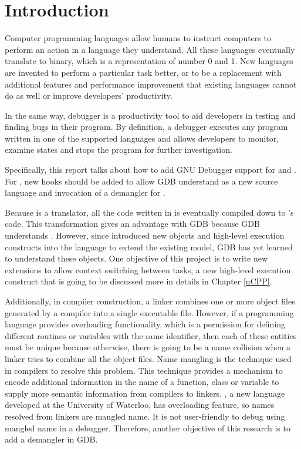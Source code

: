 \chapter{Introduction} \label{introduction}
Computer programming languages allow humans to instruct computers to perform an
action in a language they understand. All these languages eventually translate
to binary, which is a representation of number 0 and 1. New languages are
invented to perform a particular task better, or to be a replacement with
additional features and performance improvement that existing languages cannot do as well or
improve developers' productivity\cite{Reference1}.

In the same way, debugger is a productivity tool to aid developers in testing
and finding bugs in their program. By definition, a debugger executes
any program written in one of the supported languages and allows developers to
monitor, examine states and stops the program for further investigation.

Specifically, this report talks about how to add GNU Debugger support for \uCPPS
and \CFA.
For \CFA, new hooks should be added to allow GDB understand
\CFAS as a new source language and invocation of a demangler for \CFA.

Because \uCPPS is a translator, all the code written in \uCPPS is eventually
compiled down to \CC's code. This transformation gives \uCPPS an advantage with
GDB because GDB understands \CC. However, since \uCPPS introduced new objects
and high-level execution constructs into the language to extend the existing
model, GDB has yet learned to understand these objects. One objective of this
project is to write new extensions to allow context switching
between tasks, a new high-level execution construct that is going to be discussed more in
details in Chapter \ref{uCPP}.

Additionally, in compiler construction, a linker combines one or more object files generated
by a compiler into a single executable file. However, if a programming
language provides overloading functionality, which is a permission for defining different routines or variables with the
same identifier, then each of these entities must be unique because otherwise,
there is going to be a name collision when a linker tries to combine all the
object files. Name mangling is the technique used in compilers to resolve this
problem. This technique provides a mechanism to encode additional information in the
name of a function, class or variable to supply more semantic information from
compilers to linkers\cite{reference9}. \CFA, a new language developed at the University of
Waterloo, has overloading feature, so names resolved from
linkers are mangled name. It is not user-friendly to debug using mangled name in
a debugger. Therefore, another objective of this research is to add a \CFAS demangler in GDB.
